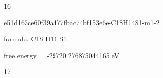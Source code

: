 \documentclass{article}
\begin{document}
16

\vspace{1cm}


e51d163ce60f39a477fbac74bf153e6e-C18H14S1-m1-2



formula: C18 H14 S1



free energy = -29720.276875044165 eV

17
\end{document}
